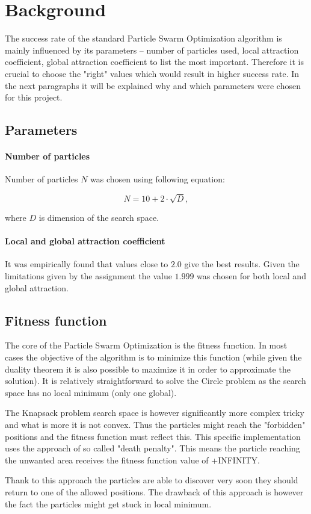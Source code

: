 \section{Background}
The success rate of the standard Particle Swarm Optimization algorithm is mainly influenced by its parameters -- number of particles used, local attraction coefficient, global attraction coefficient to list the most important. Therefore it is crucial to choose the "right" values which would result in higher success rate. In the next paragraphs it will be explained why and which parameters were chosen for this project.

\subsection{Parameters}

\paragraph{Number of particles} Number of particles $N$ was chosen using following equation:

\begin{equation}
N = 10 + 2 \cdot \sqrt{D},
\end{equation}

where $D$ is dimension of the search space.

\paragraph{Local and global attraction coefficient}
It was empirically found that values close to $2.0$ give the best results. Given the limitations given by the assignment the value $1.999$ was chosen for both local and global attraction.

\subsection{Fitness function}
The core of the Particle Swarm Optimization is the fitness function. In most cases the objective of the algorithm is to minimize this function (while given the duality theorem it is also possible to maximize it in order to approximate the solution). It is relatively straightforward to solve the Circle problem as the search space has no local minimum (only one global).

The Knapsack problem search space is however significantly more complex tricky and what is more it is not convex. Thus the particles might reach the "forbidden" positions and the fitness function must reflect this. This specific implementation uses the approach of so called "death penalty". This means the particle reaching the unwanted area receives the fitness function value of +INFINITY. 

Thank to this approach the particles are able to discover very soon they should return to one of the allowed positions. The drawback of this approach is however the fact the particles might get stuck in local minimum.